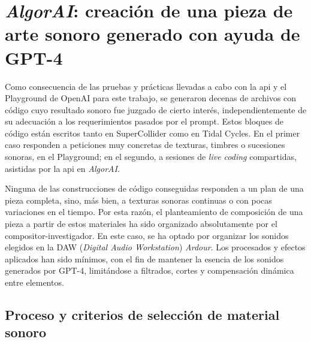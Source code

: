 \chapter{\emph{AlgorAI}: creación de una pieza de arte sonoro generado con ayuda de GPT-4}
\label{chap:algorai}



Como consecuencia de las pruebas y prácticas llevadas a cabo con la \gls{api} y el Playground de OpenAI para este trabajo, se generaron decenas de archivos con código cuyo resultado sonoro fue juzgado de cierto interés, independientemente de su adecuación a los requerimientos pasados por el prompt. Estos bloques de código están escritos tanto en SuperCollider como en Tidal Cycles. En el primer caso responden a peticiones muy concretas de texturas, timbres o sucesiones sonoras, en el Playground; en el segundo, a sesiones de \emph{live coding} compartidas, asistidas por la \gls{api} en \emph{AlgorAI}.

Ninguna de las construcciones de código conseguidas responden a un plan de una pieza completa, sino, más bien, a texturas sonoras continuas o con pocas variaciones en el tiempo. Por esta razón, el planteamiento de composición de una pieza a partir de estos materiales ha sido organizado absolutamente por el compositor-investigador. En este caso, se ha optado por organizar los sonidos elegidos en la DAW (\emph{Digital Audio Workstation}) \emph{Ardour}. Los procesados y efectos aplicados han sido mínimos, con el fin de mantener la esencia de los sonidos generados por GPT-4, limitándose a filtrados, cortes y compensación dinámica entre elementos. 




\section{Proceso y criterios de selección de material sonoro}


